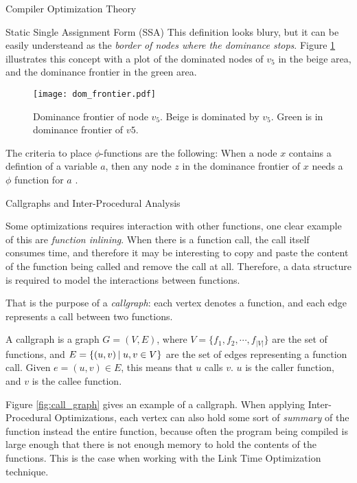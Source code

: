 \begin{section}{Compiler Optimization Theory}
\begin{subsection}{Static Single Assignment Form (SSA)}
This definition looks blury, but it can be easily understeand as the
\textit{border of nodes where the dominance stops}.  Figure \ref{fig:dom_frontier} illustrates this
concept with a plot of the dominated nodes of $v_5$ in the beige area, and the dominance frontier
in the green area.

\begin{figure}[ht]
 \centering
 \texttt{[image: dom\_frontier.pdf]}
 \caption{Dominance frontier of node $v_5$. Beige is dominated by $v_5$. Green is in dominance frontier of $v5$.}
 \label{fig:dom_frontier}
\end{figure}

The criteria to place $\phi$-functions are the following: When a node $x$ contains a defintion
of a variable $a$, then any node $z$ in the dominance frontier of $x$ needs a $\phi$ function
for $a$ \cite{appel2004modern}.

\end{subsection}

\begin{section}{Callgraphs and Inter-Procedural Analysis}

Some optimizations requires interaction with other functions, one clear example
of this are \textit{function inlining}. When there is a function call, the
call itself consumes time, and therefore it may be interesting to copy and
paste the content of the function being called and remove the call at all.
Therefore, a data structure is required to model the interactions between
functions.

That is the purpose of a \textit{callgraph}: each vertex denotes a function,
and each edge represents a call between two functions. 

\begin{definition}
	A callgraph is a graph $G = (V, E)$, where $V = \{f_1, f_2, \cdots, f_{|V|}\}$
	are the set of functions, and $E = \{(u, v)\,|\;u, v \in V\}$ are the set
	of edges representing a function call. Given $e = (u, v) \in E$, this means
	that $u$ calls $v$. $u$ is the caller function, and $v$ is the callee function.
\end{definition}

Figure \ref{fig:call_graph} gives an example of a callgraph. When applying
Inter-Procedural Optimizations, each vertex can also hold some sort of
\textit{summary} of the function instead the entire function, because often
the program being compiled is large enough that there is not enough memory
to hold the contents of the functions. This is the case when working with
the Link Time Optimization technique.


\end{section}
\end{section}
